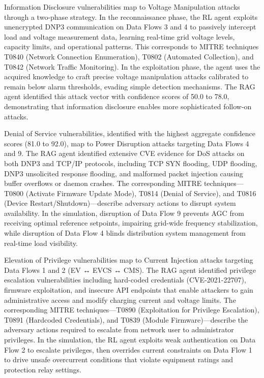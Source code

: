 Information Disclosure vulnerabilities map to Voltage Manipulation attacks through a two-phase strategy. In the reconnaissance phase, the RL agent exploits unencrypted DNP3 communication on Data Flows 3 and 4 to passively intercept load and voltage measurement data, learning real-time grid voltage levels, capacity limits, and operational patterns. This corresponds to MITRE techniques T0840 (Network Connection Enumeration), T0802 (Automated Collection), and T0842 (Network Traffic Monitoring). In the exploitation phase, the agent uses the acquired knowledge to craft precise voltage manipulation attacks calibrated to remain below alarm thresholds, evading simple detection mechanisms. The RAG agent identified this attack vector with confidence scores of 50.0 to 78.0, demonstrating that information disclosure enables more sophisticated follow-on attacks.

Denial of Service vulnerabilities, identified with the highest aggregate confidence scores (81.0 to 92.0), map to Power Disruption attacks targeting Data Flows 4 and 9. The RAG agent identified extensive CVE evidence for DoS attacks on both DNP3 and TCP/IP protocols, including TCP SYN flooding, UDP flooding, DNP3 unsolicited response flooding, and malformed packet injection causing buffer overflows or daemon crashes. The corresponding MITRE techniques—T0800 (Activate Firmware Update Mode), T0814 (Denial of Service), and T0816 (Device Restart/Shutdown)—describe adversary actions to disrupt system availability. In the simulation, disruption of Data Flow 9 prevents AGC from receiving optimal reference setpoints, impairing grid-wide frequency stabilization, while disruption of Data Flow 4 blinds distribution system management from real-time load visibility.

Elevation of Privilege vulnerabilities map to Current Injection attacks targeting Data Flows 1 and 2 (EV ↔ EVCS ↔ CMS). The RAG agent identified privilege escalation vulnerabilities including hard-coded credentials (CVE-2021-22707), firmware exploitation, and insecure API endpoints that enable attackers to gain administrative access and modify charging current and voltage limits. The corresponding MITRE techniques—T0890 (Exploitation for Privilege Escalation), T0891 (Hardcoded Credentials), and T0839 (Module Firmware)—describe the adversary actions required to escalate from network user to administrator privileges. In the simulation, the RL agent exploits weak authentication on Data Flow 2 to escalate privileges, then overrides current constraints on Data Flow 1 to drive unsafe overcurrent conditions that violate equipment ratings and protection relay settings.


